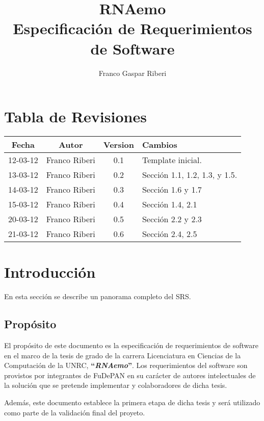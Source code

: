 \documentclass[12pt,a4paper,english,spanish]{article}
\title{\textbf{RNAemo}\\ \vspace{0.45cm} Especificación de Requerimientos de Software} %
\author{Franco Gaspar Riberi}
\newcommand{\rnaemo}{\textbf{\emph{RNAemo}}}
\begin{document}
\maketitle\pagebreak{}\tableofcontents{}\pagebreak{}

\section*{Tabla de Revisiones}
	
\begin{center}
\begin{tabular}{| c | c | c | l |}
	\hline
	{\bf Fecha} & {\bf Autor} & {\bf Version} & {\bf Cambios}\\
	\hline
	\hline		
	12-03-12 & Franco Riberi & 0.1 & Template inicial.\\\hline
	13-03-12 & Franco Riberi & 0.2 & Sección 1.1, 1.2, 1.3,  y 1.5.\\\hline
	14-03-12 & Franco Riberi & 0.3 & Sección 1.6 y 1.7\\\hline
	15-03-12 & Franco Riberi & 0.4 & Sección 1.4, 2.1 \\\hline
	20-03-12 & Franco Riberi & 0.5 & Sección 2.2 y 2.3 \\\hline
	21-03-12 & Franco Riberi & 0.6 & Sección 2.4, 2.5 \\\hline
\end{tabular}
\end{center}
\newpage

\section{Introducción}
En esta sección se describe un panorama completo del SRS.

\subsection{Propósito}
\par El propósito de este documento es la especificación de requerimientos
de software en el marco de la tesis de grado de la carrera Licenciatura en
Ciencias de la Computación de la UNRC, \textbf{``}\rnaemo\textbf{''}.  Los requerimientos 
del software son provistos por integrantes de FuDePAN en su carácter de autores
intelectuales de la solución que se pretende implementar y colaboradores
de dicha tesis.
\par Además, este documento establece la primera etapa de dicha tesis y será utilizado
como parte de la validación final del proyeto.
\end{document}
